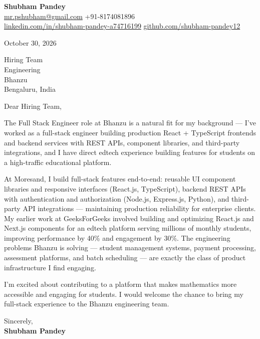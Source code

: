 \documentclass[a4paper,11pt]{article}
\begin{document}
\textbf{\Large Shubham Pandey}\\
\href{mailto:mr.pshubham@gmail.com}{mr.pshubham@gmail.com} \quad +91-8174081896\\
\href{https://www.linkedin.com/in/shubham-pandey-a74716199/}{linkedin.com/in/shubham-pandey-a74716199} \quad
\href{https://github.com/shubham-pandey12}{github.com/shubham-pandey12}

\vspace{1em}
October 30, 2026

\vspace{1em}
Hiring Team\\
Engineering\\
Bhanzu\\
Bengaluru, India

\vspace{1em}
Dear Hiring Team,

The Full Stack Engineer role at Bhanzu is a natural fit for my background --- I've worked as a full-stack engineer building production React + TypeScript frontends and backend services with REST APIs, component libraries, and third-party integrations, and I have direct edtech experience building features for students on a high-traffic educational platform.

At Moresand, I build full-stack features end-to-end: reusable UI component libraries and responsive interfaces (React.js, TypeScript), backend REST APIs with authentication and authorization (Node.js, Express.js, Python), and third-party API integrations --- maintaining production reliability for enterprise clients. My earlier work at GeeksForGeeks involved building and optimizing React.js and Next.js components for an edtech platform serving millions of monthly students, improving performance by 40\% and engagement by 30\%. The engineering problems Bhanzu is solving --- student management systems, payment processing, assessment platforms, and batch scheduling --- are exactly the class of product infrastructure I find engaging.

I'm excited about contributing to a platform that makes mathematics more accessible and engaging for students. I would welcome the chance to bring my full-stack experience to the Bhanzu engineering team.

\vspace{1em}
Sincerely,\\[0.5em]
\textbf{Shubham Pandey}
\end{document}
